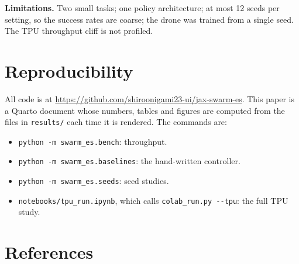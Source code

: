 \documentclass[
]{article}
\providecommand{\tightlist}{%
  \setlength{\itemsep}{0pt}\setlength{\parskip}{0pt}}
\begin{document}
\textbf{Limitations.} Two small tasks; one policy architecture; at most
12 seeds per setting, so the success rates are coarse; the drone was
trained from a single seed. The TPU throughput cliff is not profiled.

\section{Reproducibility}\label{reproducibility}

All code is at \url{https://github.com/shiroonigami23-ui/jax-swarm-es}.
This paper is a Quarto document whose numbers, tables and figures are
computed from the files in \texttt{results/} each time it is rendered.
The commands are:

\begin{itemize}
\tightlist
\item
  \texttt{python\ -m\ swarm\_es.bench}: throughput.
\item
  \texttt{python\ -m\ swarm\_es.baselines}: the hand-written controller.
\item
  \texttt{python\ -m\ swarm\_es.seeds}: seed studies.
\item
  \texttt{notebooks/tpu\_run.ipynb}, which calls
  \texttt{colab\_run.py\ -\/-tpu}: the full TPU study.
\end{itemize}

\section*{References}\label{references}
\end{document}
